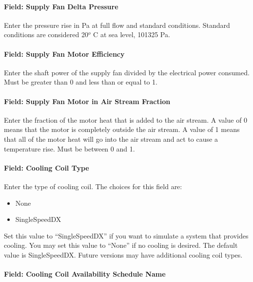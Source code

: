 \paragraph{Field: Supply Fan Delta Pressure}\label{field-supply-fan-delta-pressure-4}

Enter the pressure rise in Pa at full flow and standard conditions. Standard conditions are considered 20\(^{o}\) C at sea level, 101325 Pa.

\paragraph{Field: Supply Fan Motor Efficiency}\label{field-supply-fan-motor-efficiency-5}

Enter the shaft power of the supply fan divided by the electrical power consumed. Must be greater than 0 and less than or equal to 1.

\paragraph{Field: Supply Fan Motor in Air Stream Fraction}\label{field-supply-fan-motor-in-air-stream-fraction-1}

Enter the fraction of the motor heat that is added to the air stream. A value of 0 means that the motor is completely outside the air stream. A value of 1 means that all of the motor heat will go into the air stream and act to cause a temperature rise. Must be between 0 and 1.

\paragraph{Field: Cooling Coil Type}\label{field-cooling-coil-type-5}

Enter the type of cooling coil. The choices for this field are:

\begin{itemize}
\item
  None
\item
  SingleSpeedDX
\end{itemize}

Set this value to ``SingleSpeedDX'' if you want to simulate a system that provides cooling. You may set this value to ``None'' if no cooling is desired. The default value is SingleSpeedDX. Future versions may have additional cooling coil types.

\paragraph{Field: Cooling Coil Availability Schedule Name}\label{field-cooling-coil-availability-schedule-name-4}

